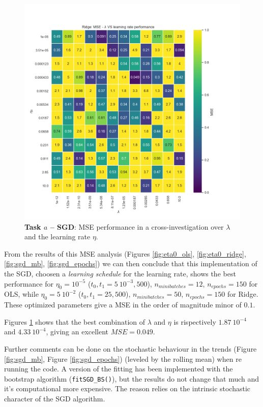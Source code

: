 \documentclass[english,notitlepage,reprint,nofootinbib]{revtex4-1}  %
\begin{document}
\begin{figure}[h]
    \centering 
    \includegraphics[scale=0.3]{SGD/SGD_lambda_eta.png}
    \caption{\textbf{Task $a$ – SGD}: MSE performance in a cross-investigation over $\lambda$ and the learning rate $\eta$.}
    \label{fig:lmd_eta}
\end{figure}

From the results of this MSE analysis (Figures \ref{fig:eta0_ols}, \ref{fig:eta0_ridge}, \ref{fig:sgd_mb}, \ref{fig:sgd_epochs}) we can then conclude that this implementation of the SGD, choosen a \textit{learning schedule} for the learning rate, shows the best performance for $\eta_0=10^{-5}$ ($t_0, t_1 = 5 \ 10^{-3}, 500$), $n_{minibatches} = 12$, $n_{epochs} = 150$ for OLS, while $\eta_0=5 \ 10^{-2}$ ($t_0, t_1 = 25, 500$), $n_{minibatches} = 50$, $n_{epochs} = 150$ for Ridge. These optimized parameters give a MSE in the order of magnitude minor of $0.1$.

Figures \ref{fig:lmd_eta} shows that the best combination of $\lambda$ and $\eta$ is rispectively $1.87\ 10^{-4}$ and $4.33 \ 10^{-4}$, giving an excellent $MSE=0.049$.

Further comments can be done on the stochastic behaviour in the trends (Figure \ref{fig:sgd_mb}, Figure \ref{fig:sgd_epochs}) (leveled by the rolling mean) when re running the code. A version of the fitting has been implemented with the bootstrap algorithm (\texttt{fitSGD\_BS()}), but the results do not change that much and it's computational more expensive. The reason relies on the intrinsic stochastic character of the SGD algorithm.
\end{document}
